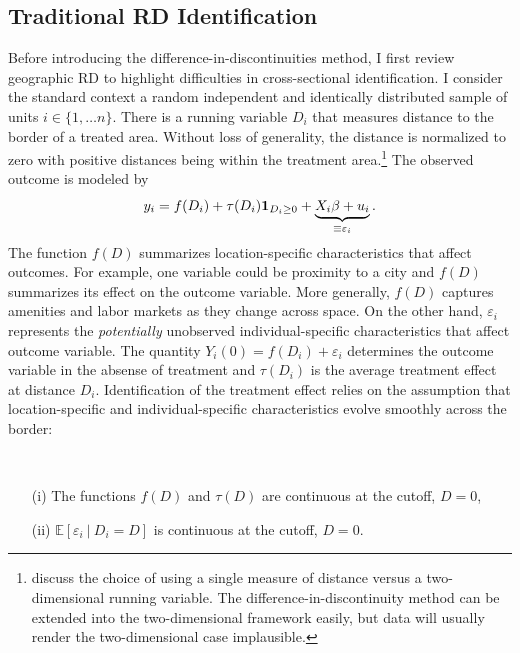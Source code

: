 \documentclass[12pt]{article}
\begin{document}
\subsection{Traditional RD Identification}

Before introducing the difference-in-discontinuities method, I first review geographic RD to highlight difficulties in cross-sectional identification. I consider the standard context a random independent and identically distributed sample of units $i \in \{1, \dots n\}$. There is a running variable $D_i$ that measures distance to the border of a treated area. Without loss of generality, the distance is normalized to zero with positive distances being within the treatment area.\footnote{\citet{Keele_Titiunik_2015} discuss the choice of using a single measure of distance versus a two-dimensional running variable. The difference-in-discontinuity method can be extended into the two-dimensional framework easily, but data will usually render the two-dimensional case implausible.} The observed outcome is modeled by 
\begin{equation}\label{eq:model}
    y_i = f(D_i) + \tau(D_i) \mathbf{1}_{D_i \geq 0} + \underbrace{X_i \beta + u_i}_{\equiv \varepsilon_i}. 
\end{equation}
The function $f(D)$ summarizes location-specific characteristics that affect outcomes. For example, one variable could be proximity to a city and $f(D)$ summarizes its effect on the outcome variable. More generally, $f(D)$ captures amenities and labor markets as they change across space. On the other hand, $\varepsilon_i$ represents the \emph{potentially} unobserved individual-specific characteristics that affect outcome variable. The quantity $Y_i(0) = f(D_i) + \varepsilon_i$ determines the outcome variable in the absense of treatment and $\tau(D_i)$ is the average treatment effect at distance $D_i$. Identification of the treatment effect relies on the assumption that location-specific and individual-specific characteristics evolve smoothly across the border:

\begin{assumption}[RD]\label{eq:continuity}\ \\\vspace{-10mm} 
    \begin{itemize}
        \item[(i)] The functions $f(D)$ and $\tau(D)$ are continuous at the cutoff, $D = 0$,
        \item[(ii)] $\mathbb{E}\left[ \varepsilon_i \ \vert \ D_i = D \right]$ is continuous at the cutoff, $D = 0$. 
    \end{itemize}
\end{assumption}
\end{document}
